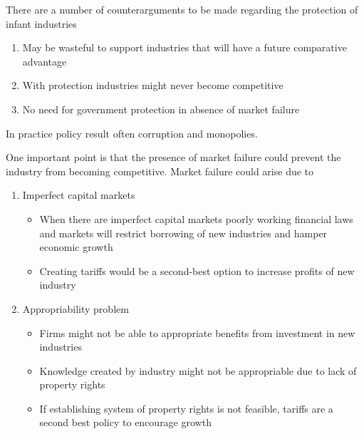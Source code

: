 \documentclass{beamer}
\begin{document}
\begin{frame}
  There are a number of counterarguments to be made regarding the protection of infant industries
  \begin{enumerate}
    \item May be wasteful to support industries that will have a future comparative advantage
    \item With protection industries might never become competitive
    \item No need for government protection in absence of market failure
  \end{enumerate}
  \medskip
  In practice policy result often corruption and monopolies.
\end{frame}

\begin{frame}
 One important point is that the presence of market failure could prevent the industry from becoming competitive. 
 Market failure could arise due to
 \begin{enumerate}
   \item Imperfect capital markets
   \begin{itemize}
     \item When there are imperfect capital markets poorly working financial laws and markets will restrict borrowing of new industries and hamper economic growth
     \item Creating tariffs would be a second-best option to increase profits of new industry
   \end{itemize}
   \medskip
   \item Appropriability problem
   \begin{itemize}
     \item Firms might not be able to appropriate benefits from investment in new industries
     \item Knowledge created by industry might not be appropriable due to lack of property rights
     \item If establishing system of property rights is not feasible, tariffs are a second best policy to encourage growth
   \end{itemize}
 \end{enumerate}
\end{frame}
\end{document}
